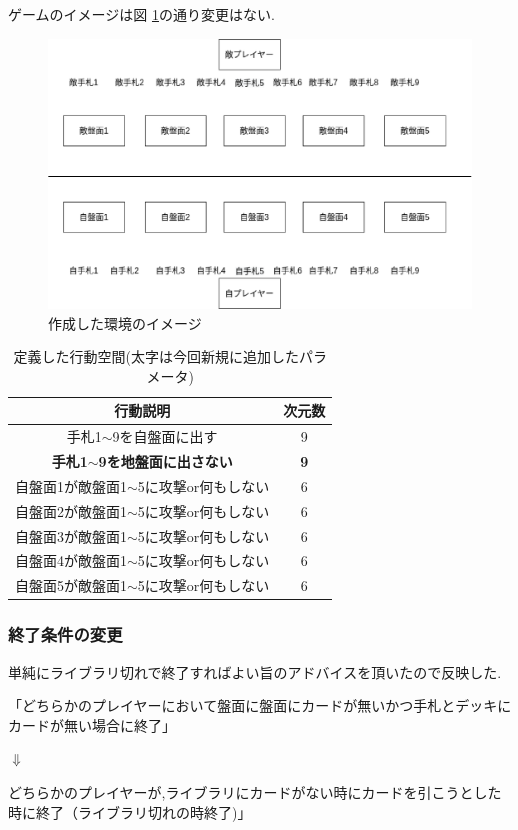 \documentclass{jarticle}     %
\begin{document}
ゲームのイメージは図 \ref{fig:env}の通り変更はない.

\begin{figure}[H]
  \centering
  \includegraphics[width=160mm]{assets/idea.eps}
  \caption{作成した環境のイメージ}
  \label{fig:env}
\end{figure}

\begin{table}[H]
  \centering
  \caption{定義した行動空間(太字は今回新規に追加したパラメータ)}
  \label{table:action}
  \begin{tabular}{|c|c|}
  \hline
  行動説明                          & 次元数        \\ \hline
  手札1$\sim$9を自盤面に出す             & 9          \\ \hline
  \textbf{手札1$\sim$9を地盤面に出さない} & \textbf{9} \\ \hline
  自盤面1が敵盤面1$\sim$5に攻撃or何もしない    & 6          \\ \hline
  自盤面2が敵盤面1$\sim$5に攻撃or何もしない    & 6          \\ \hline
  自盤面3が敵盤面1$\sim$5に攻撃or何もしない    & 6          \\ \hline
  自盤面4が敵盤面1$\sim$5に攻撃or何もしない    & 6          \\ \hline
  自盤面5が敵盤面1$\sim$5に攻撃or何もしない    & 6          \\ \hline
  \end{tabular}
  \end{table}

\subsubsection{終了条件の変更}
単純にライブラリ切れで終了すればよい旨のアドバイスを頂いたので反映した.\par
「どちらかのプレイヤーにおいて盤面に盤面にカードが無いかつ手札とデッキにカードが無い場合に終了」
\par
$\Downarrow$
\par
どちらかのプレイヤーが,ライブラリにカードがない時にカードを引こうとした時に終了（ライブラリ切れの時終了)」
\end{document}
